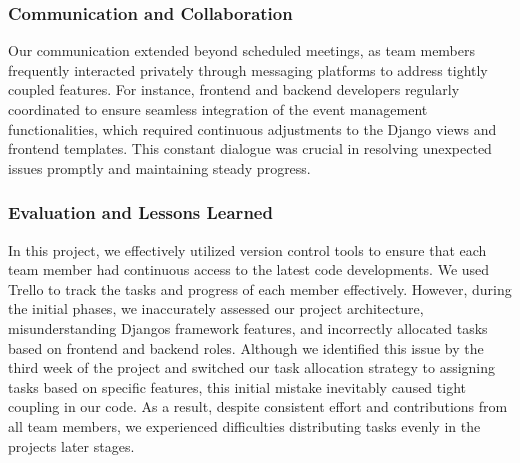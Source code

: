 \subsubsection{Communication and Collaboration}\label{Communication and Collaboration}

Our communication extended beyond scheduled meetings, as team members
frequently interacted privately through messaging platforms to address
tightly coupled features. For instance, frontend and backend developers
regularly coordinated to ensure seamless integration of the event
management functionalities, which required continuous adjustments to the
Django views and frontend templates. This constant dialogue was crucial
in resolving unexpected issues promptly and maintaining steady progress.

\subsubsection{Evaluation and Lessons Learned}\label{Evaluation and Lessons Learned}

In this project, we effectively utilized version control tools to ensure
that each team member had continuous access to the latest code
developments. We used Trello to track the tasks and progress of each
member effectively. However, during the initial phases, we inaccurately
assessed our project architecture, misunderstanding
Django\textquotesingle s framework features, and incorrectly allocated
tasks based on frontend and backend roles. Although we identified this
issue by the third week of the project and switched our task allocation
strategy to assigning tasks based on specific features, this initial
mistake inevitably caused tight coupling in our code. As a result,
despite consistent effort and contributions from all team members, we
experienced difficulties distributing tasks evenly in the
project\textquotesingle s later stages.
